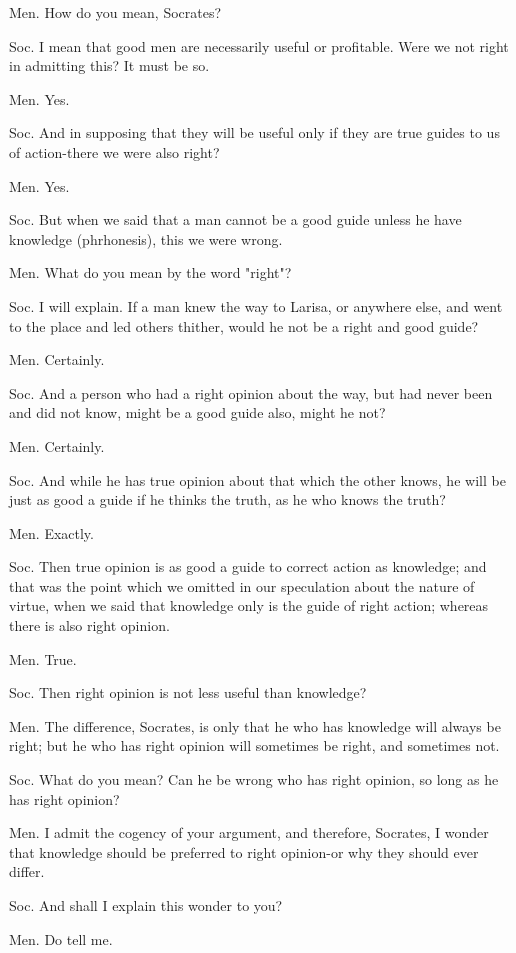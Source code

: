 Men. How do you mean, Socrates? 

Soc. I mean that good men are necessarily useful or profitable. Were
we not right in admitting this? It must be so. 

Men. Yes. 

Soc. And in supposing that they will be useful only if they are true
guides to us of action-there we were also right? 

Men. Yes. 

Soc. But when we said that a man cannot be a good guide unless he
have knowledge (phrhonesis), this we were wrong. 

Men. What do you mean by the word "right"? 

Soc. I will explain. If a man knew the way to Larisa, or anywhere
else, and went to the place and led others thither, would he not be
a right and good guide? 

Men. Certainly. 

Soc. And a person who had a right opinion about the way, but had never
been and did not know, might be a good guide also, might he not?

Men. Certainly. 

Soc. And while he has true opinion about that which the other knows,
he will be just as good a guide if he thinks the truth, as he who
knows the truth? 

Men. Exactly. 

Soc. Then true opinion is as good a guide to correct action as knowledge;
and that was the point which we omitted in our speculation about the
nature of virtue, when we said that knowledge only is the guide of
right action; whereas there is also right opinion. 

Men. True. 

Soc. Then right opinion is not less useful than knowledge?

Men. The difference, Socrates, is only that he who has knowledge will
always be right; but he who has right opinion will sometimes be right,
and sometimes not. 

Soc. What do you mean? Can he be wrong who has right opinion, so long
as he has right opinion? 

Men. I admit the cogency of your argument, and therefore, Socrates,
I wonder that knowledge should be preferred to right opinion-or why
they should ever differ. 

Soc. And shall I explain this wonder to you? 

Men. Do tell me. 

